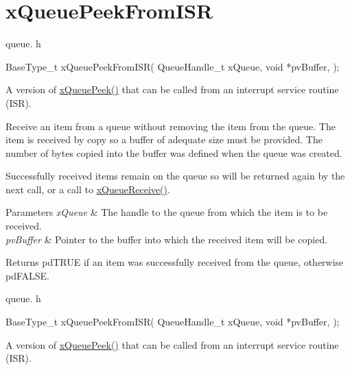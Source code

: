 \hypertarget{group__x_queue_peek_from_i_s_r}{}\section{x\+Queue\+Peek\+From\+I\+SR}
\label{group__x_queue_peek_from_i_s_r}
queue. h 
\begin{DoxyPre}
BaseType\_t xQueuePeekFromISR(
                                 QueueHandle\_t xQueue,
                                 void *pvBuffer,
                             );
\end{DoxyPre}


A version of \hyperlink{vendor_2ceedling_2plugins_2freertos_2src_2freertos_2include_2queue_8h_a2df70733bb875477cd9614c5b3446257}{x\+Queue\+Peek()} that can be called from an interrupt service routine (I\+SR).

Receive an item from a queue without removing the item from the queue. The item is received by copy so a buffer of adequate size must be provided. The number of bytes copied into the buffer was defined when the queue was created.

Successfully received items remain on the queue so will be returned again by the next call, or a call to \hyperlink{vendor_2ceedling_2plugins_2freertos_2src_2freertos_2include_2queue_8h_af1549eac0e7f05694a59a0b967c80be3}{x\+Queue\+Receive()}.


\begin{DoxyParams}{Parameters}
{\em x\+Queue} & The handle to the queue from which the item is to be received.\\
\hline
{\em pv\+Buffer} & Pointer to the buffer into which the received item will be copied.\\
\hline
\end{DoxyParams}
\begin{DoxyReturn}{Returns}
pd\+T\+R\+UE if an item was successfully received from the queue, otherwise pd\+F\+A\+L\+SE.
\end{DoxyReturn}
queue. h 
\begin{DoxyPre}
BaseType\_t xQueuePeekFromISR(
                                QueueHandle\_t xQueue,
                                void *pvBuffer,
                            );\end{DoxyPre}


A version of \hyperlink{vendor_2ceedling_2plugins_2freertos_2src_2freertos_2include_2queue_8h_a2df70733bb875477cd9614c5b3446257}{x\+Queue\+Peek()} that can be called from an interrupt service routine (I\+SR).

